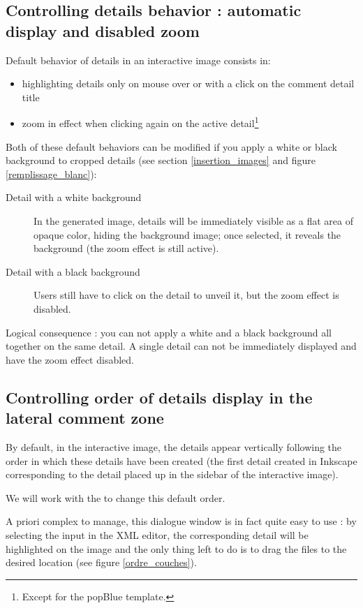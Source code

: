 \subsection{Controlling details behavior : automatic display and disabled zoom}\label{white_black_background}
\label{couche_XML}

Default behavior of details in an interactive image consists in:
\begin{itemize}
 \item highlighting details only on mouse over or with a click on the comment 
 detail title
 \item zoom in effect when clicking again on the active detail\footnote{Except 
 for the popBlue template.}
\end{itemize}

Both of these default behaviors can be modified if you apply a white
 or black background to cropped details (see section 
\ref{insertion_images} 
 and figure
\ref{remplissage_blanc}):
\begin{description}
 \item [Detail with a white background] In the generated image, details will be
 immediately visible as a flat area of opaque color, hiding the background image;  
 once selected, it reveals the background (the zoom effect is still active).
 \item [Detail with a black background] Users still have to click on the detail to unveil it, but the zoom effect is disabled.
\end{description}

Logical consequence : you can not apply a white and a black background all together on the same detail.
A single detail can not be immediately displayed and have the zoom effect disabled.

\subsection{Controlling order of details display in the lateral comment zone}

By default, in the interactive image, the details appear vertically following the order in which these details have been created (the first detail created in Inkscape corresponding to the detail placed up in the sidebar of the interactive image).

We will work with the  to change this default order.

A priori complex to manage, this dialogue window is in fact quite easy to use : 
by selecting the input in the XML editor, the corresponding detail will be
highlighted on the image and the only thing left 
to do is to drag the files to the desired location (see figure \ref{ordre_couches}).

